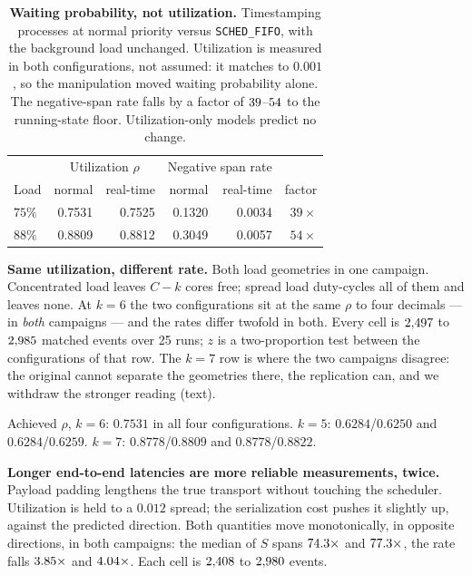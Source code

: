 \documentclass[10pt,journal,onecolumn]{IEEEtran}
\begin{document}
\begin{table}[t]
\caption[Waiting probability, not utilization]{\textbf{Waiting probability, not utilization.} Timestamping processes at normal priority versus
\texttt{SCHED\_FIFO}, with the background load unchanged. Utilization is measured in both configurations,
not assumed: it matches to $0.001$, so the manipulation moved waiting probability alone. The negative-span rate
falls by a factor of $39$--$54$ to the running-state floor. Utilization-only models predict no
change.}
\label{tab:ea5}
\begin{tabular}{lrrrrr}
\toprule
& \multicolumn{2}{c}{Utilization $\rho$} & \multicolumn{2}{c}{Negative span rate} & \\
\cmidrule(lr){2-3}\cmidrule(lr){4-5}
Load & normal & real-time & normal & real-time & factor \\
\midrule
$75\%$ & 0.7531 & 0.7525 & 0.1320 & 0.0034 & $39\times$ \\
$88\%$ & 0.8809 & 0.8812 & 0.3049 & 0.0057 & $54\times$ \\
\bottomrule
\end{tabular}
\end{table}


\begin{table}[t]
\caption[Same utilization, different rate]{\textbf{Same utilization, different rate.} Both load geometries in one campaign.
Concentrated load leaves $C-k$ cores free; spread load duty-cycles all of them and leaves none.
At $k=6$ the two configurations sit at the same $\rho$ to four decimals ---
in \textnormal{\textit{both}} campaigns --- and the rates differ twofold in both. Every cell is
$\geomEventsLo$ to $\geomEventsHi$ matched events over 25 runs; $z$ is a two-proportion test
between the configurations of that row. The $k=7$ row is
where the two campaigns disagree: the original cannot separate the geometries there, the
replication can, and we withdraw the stronger reading (text).}
\label{tab:ea6}

\vspace{2pt}
\footnotesize Achieved $\rho$, $k=6$: $0.7531$ in all four configurations. $k=5$: $0.6284$/$0.6250$ and
$0.6284$/$0.6259$. $k=7$: $0.8778$/$0.8809$ and $0.8778$/$0.8822$.
\end{table}


\begin{table}[t]
\caption[Longer end-to-end latencies are more reliable measurements, twice]{\textbf{Longer end-to-end latencies are more reliable measurements, twice.} Payload padding lengthens
the true transport without touching the scheduler. Utilization is held to a $0.012$ spread; the
serialization cost pushes it slightly up, against the predicted direction. Both quantities move
monotonically, in opposite directions, in both campaigns: the median of $S$ spans $\payloadTransportFactor\times$ and
$\payloadReplTransportFactor\times$, the rate falls $\payloadRateFallExact\times$ and $\payloadReplRateFall\times$. Each cell is
$\payloadEventsLo$ to $\payloadEventsHi$ events.}
\label{tab:ea10}
\end{table}
\end{document}
